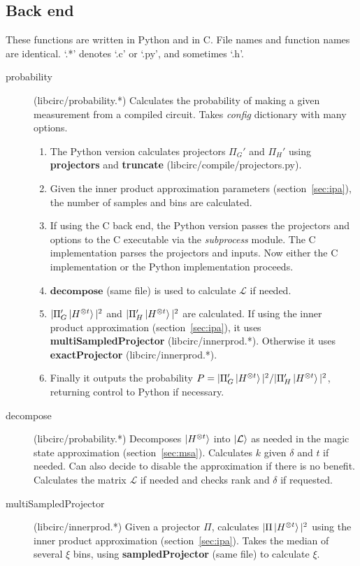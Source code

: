 \documentclass[11pt]{article}
\begin{document}
\subsection{Back end}
These functions are written in Python and in C. File names and function names are identical. `.*' denotes `.c' or `.py', and sometimes `.h'.

\begin{description}
    \item[probability] (libcirc/probability.*) Calculates the probability of making a given measurement from a compiled circuit. Takes \textit{config} dictionary with many options.
    \begin{enumerate}
        \setlength{\itemsep}{1pt}
        \item The Python version calculates projectors $\Pi_G'$ and $\Pi_H'$ using \textbf{projectors} and \textbf{truncate} (libcirc/compile/projectors.py).
        \item Given the inner product approximation parameters (section~\ref{sec:ipa}), the number of samples and bins are calculated.
        \item If using the C back end, the Python version passes the projectors and options to the C executable via the \textit{subprocess} module. The C implementation parses the projectors and inputs. Now either the C implementation or the Python implementation proceeds.
        \item $\textbf{decompose}$ (same file) is used to calculate $\mathcal{L}$ if needed.
            \item $|\Pi_G'\ket{H^{\otimes t}}|^2$ and $|\Pi_H'\ket{H^{\otimes t}}|^2$ are calculated. If using the inner product approximation (section~\ref{sec:ipa}), it uses \textbf{multiSampledProjector} (libcirc/innerprod.*). Otherwise it uses \textbf{exactProjector} (libcirc/innerprod.*).
        \item Finally it outputs the probability $P = |\Pi_G'\ket{H^{\otimes t}}|^2 / |\Pi_H'\ket{H^{\otimes t}}|^2$, returning control to Python if necessary.
    \end{enumerate}
    \item[decompose] (libcirc/probability.*) Decomposes $\ket{H^{\otimes t}}$ into $\ket{\mathcal{L}}$ as needed in the magic state approximation (section~\ref{sec:msa}). Calculates $k$ given $\delta$ and $t$ if needed. Can also decide to disable the approximation if there is no benefit. Calculates the matrix $\mathcal{L}$ if needed and checks rank and $\delta$ if requested.
    \item[multiSampledProjector] (libcirc/innerprod.*) Given a projector $\Pi$, calculates $|\Pi\ket{H^{\otimes t}}|^2$ using the inner product approximation (section~\ref{sec:ipa}). Takes the median of several $\xi$ bins, using \textbf{sampledProjector} (same file) to calculate $\xi$.

\end{description}
\end{document}

